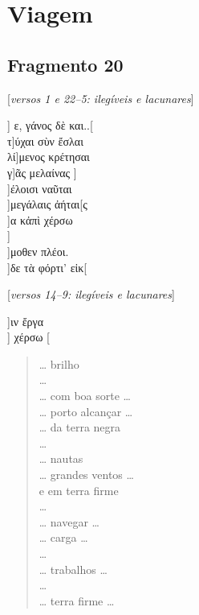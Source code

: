 \chapter{Viagem}

\section{Fragmento 20}

\begin{gkverse}
\textnormal{[\emph{versos 1 e 22--5: ilegíveis e lacunares}]}

] ε, γάνος δὲ και..[\\
τ]ύχαι σὺν ἔσλαι\\
         λί]μενος κρέτησαι\\
  γ]ᾶς μελαίνας
    ]\\
    ]έλοισι ναῦται\\
  ]μεγάλαις ἀήται[ς\\
  ]α κἀπὶ χέρσω\\
    ]\\
   ]μοθεν πλέοι.\\
  ]δε τὰ φόρτι’ εἰκ[

\textnormal{[\emph{versos 14--9: ilegíveis e lacunares}]}

]ιν ἔργα\\
] χέρσω [
\end{gkverse}

\begin{verse}
\ldots{} brilho\\
\ldots{}\\
\ldots{} com boa sorte \ldots{}\\
\ldots{} porto alcançar \ldots{} \\
\ldots{} da terra negra\\
\ldots{} \\
\ldots{} nautas\\
\ldots{} grandes ventos \ldots{}\\
e em terra firme\\
\ldots{}\\
\ldots{} navegar \ldots{}\\
\ldots{} carga \ldots{}\\
\ldots{}\\
\ldots{} trabalhos \ldots{}\\
\ldots{}\\
\ldots{} terra firme \ldots{}
\end{verse}

\medskip

